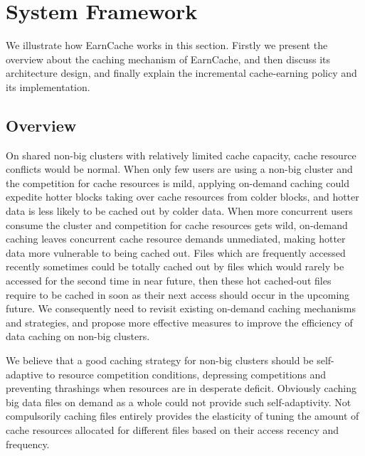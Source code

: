 \renewcommand{\algorithmicrequire}{\textbf{Input:}}
\renewcommand{\algorithmicensure}{\textbf{Output:}}

\section{System Framework}\label{sec:SDI}
We illustrate how EarnCache works in this section. Firstly we present the overview about the caching mechanism of EarnCache, and then discuss its architecture design, and finally explain the incremental cache-earning policy and its implementation.

\subsection{Overview}\label{sec:overview}

On shared non-big clusters with relatively limited cache capacity, cache resource conflicts would be normal.
When only few users are using a non-big cluster and the competition for cache resources is mild, applying on-demand caching could expedite hotter blocks taking over cache resources from colder blocks, and hotter data is less likely to be cached out by colder data. When more concurrent users consume the cluster and competition for cache resources gets wild, on-demand caching leaves concurrent cache resource demands unmediated, making hotter data more vulnerable to being cached out. 
Files which are frequently accessed recently sometimes could be totally cached out by files which would rarely be accessed for the second time in near future, then these hot cached-out files require to be cached in soon as their next access should occur in the upcoming future. We consequently need to revisit existing on-demand caching mechanisms and strategies, and propose more effective measures to improve the efficiency of data caching on non-big clusters.

We believe that a good caching strategy for non-big clusters should be self-adaptive to resource competition conditions, depressing competitions and preventing thrashings when resources are in desperate deficit.
Obviously caching big data files on demand as a whole could not provide such self-adaptivity. 
Not compulsorily caching files entirely provides the elasticity of tuning the amount of cache resources allocated for different files based on their access recency and frequency.

